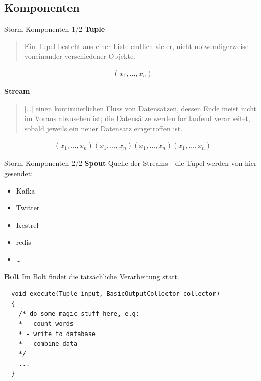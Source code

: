 \documentclass{beamer}
\begin{document}
\subsection{Komponenten}
\begin{frame}[t]{Storm Komponenten 1/2}
  \textbf{Tuple}
  \begin{quote}
    Ein Tupel besteht aus einer Liste endlich vieler, nicht notwendigerweise voneinander verschiedener Objekte.
  \end{quote}
  \setlength{\abovedisplayskip}{0pt}
  \setlength{\abovedisplayshortskip}{0pt}
  \begin{align*}
    (x_1, \ldots , x_n)
  \end{align*}

  \pause

  \textbf{Stream}
  \begin{quote}
    [\ldots] einen kontinuierlichen Fluss von Datensätzen, dessen Ende meist nicht im Voraus abzusehen ist; die Datensätze werden fortlaufend verarbeitet, sobald jeweils ein neuer Datensatz eingetroffen ist.
  \end{quote}

  \begin{align*}
    (x_1, \ldots , x_n)
    (x_1, \ldots , x_n)
    (x_1, \ldots , x_n)
    (x_1, \ldots , x_n)
  \end{align*}
  \begin{figure}
    \centering
    \vspace*{-1cm}
  \end{figure}
\end{frame}

\begin{frame}[fragile]{Storm Komponenten 2/2}
  \textbf{Spout}
  Quelle der Streams - die Tupel werden von hier gesendet: 
  \begin{itemize}
    \item Kafka 
    \item Twitter 
    \item Kestrel 
    \item redis
    \item \ldots
  \end{itemize}

  \pause

  \textbf{Bolt}
  Im Bolt findet die tatsächliche Verarbeitung statt.
  \begin{lstlisting}
  void execute(Tuple input, BasicOutputCollector collector)
  {
    /* do some magic stuff here, e.g:
    * - count words
    * - write to database
    * - combine data
    */
    ...
  }

  \end{lstlisting}
\end{frame}
\end{document}
